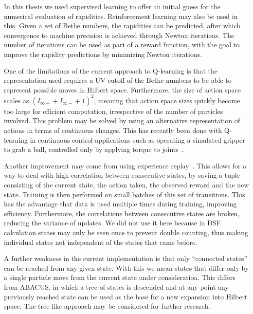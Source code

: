 \documentclass[11pt, a4paper]{report} %
\begin{document}
In this thesis we used supervised learning to offer an initial guess for the numerical evaluation of rapidities.
Reinforcement learning may also be used in this.
Given a set of Bethe numbers, the rapidities can be predicted, after which convergence to machine precision is achieved through Newton iterations.
The number of iterations can be used as part of a reward function, with the goal to improve the rapidity predictions by minimizing Newton iterations.

One of the limitations of the current approach to Q-learning is that the representation used requires a UV cutoff of the Bethe numbers to be able to represent possible moves in Hilbert space.
Furthermore, the size of action space scales as \({(I_{\infty+} + I_{\infty-} + 1)}^2\), meaning that action space sizes quickly become too large for efficient computation, irrespective of the number of particles involved.
This problem may be solved by using an alternative representation of actions in terms of continuous changes.
This has recently been done with Q-learning in continuous control applications such as operating a simulated gripper to grab a ball, controlled only by applying torque to joints~\cite{lillicrap15_contin_contr_with_deep_reinf_learn,gu16_contin_deep_q_learn_with}.

Another improvement may come from using experience replay~\cite{mnih15_human_level_contr_throug_deep_reinf_learn,mnih13_playin_atari_with_deep_reinf_learn}.
This allows for a way to deal with high correlation between consecutive states, by saving a tuple consisting of the current state, the action taken, the observed reward and the new state.
Training is then performed on small batches of this set of transitions.
This has the advantage that data is used multiple times during training, improving efficiency.
Furthermore, the correlations between consecutive states are broken, reducing the variance of updates.
We did not use it here because in DSF calculation states may only be seen once to prevent double counting, thus making individual states not independent of the states that came before.

A further weakness in the current implementation is that only ``connected states'' can be reached from any given state.
With this we mean states that differ only by a single particle move from the current state under consideration.
This differs from ABACUS, in which a tree of states is descended and at any point any previously reached state can be used as the base for a new expansion into Hilbert space.
The tree-like approach may be considered for further research.
\end{document}
